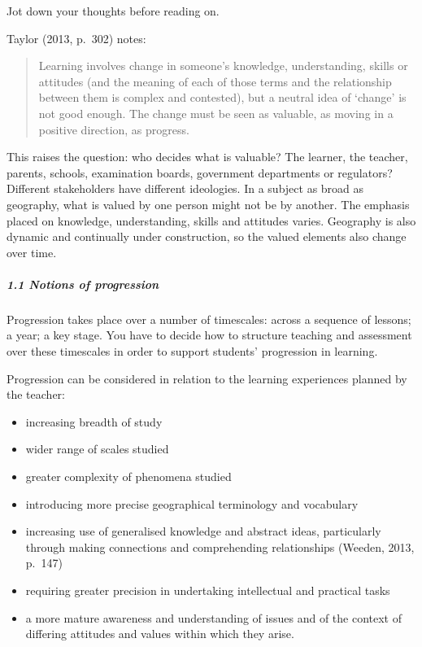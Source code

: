 \documentclass[letterpaper,10pt,english]{sphinxmanual}
\begin{document}
Jot down your thoughts before reading on.

Taylor (2013, p. 302) notes:


\begin{quote}

Learning involves change in someone’s knowledge, understanding, skills or attitudes (and the meaning of each of those terms and the relationship between them is complex and contested), but a neutral idea of ‘change’ is not good enough. The change must be seen as valuable, as moving in a positive direction, as progress.
\end{quote}

This raises the question: who decides what is valuable? The learner, the teacher, parents, schools, examination boards, government departments or regulators? Different stakeholders have different ideologies. In a subject as broad as geography, what is valued by one person might not be by another. The emphasis placed on knowledge, understanding, skills and attitudes varies. Geography is also dynamic and continually under construction, so the valued elements also change over time.


\subparagraph{1.1 Notions of progression}
\label{\detokenize{content/session_00/Part_00_01:1.1-Notions-of-progression}}
Progression takes place over a number of timescales: across a sequence of lessons; a year; a key stage. You have to decide how to structure teaching and assessment over these timescales in order to support students’ progression in learning.

Progression can be considered in relation to the learning experiences planned by the teacher:
\begin{itemize}
\item {} 
increasing breadth of study

\item {} 
wider range of scales studied

\item {} 
greater complexity of phenomena studied

\item {} 
introducing more precise geographical terminology and vocabulary

\item {} 
increasing use of generalised knowledge and abstract ideas, particularly through making connections and comprehending relationships (Weeden, 2013, p. 147)

\item {} 
requiring greater precision in undertaking intellectual and practical tasks

\item {} 
a more mature awareness and understanding of issues and of the context of differing attitudes and values within which they arise.

\end{itemize}
\end{document}
